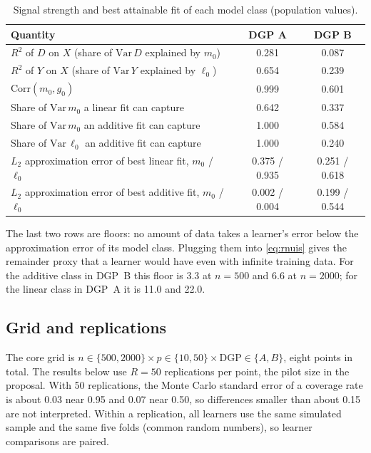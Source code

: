 \documentclass[11pt,a4paper]{article}
\begin{document}
\begin{table}[t]
\centering\small
\caption{Signal strength and best attainable fit of each model class (population values).}\label{tab:dgp}
\begin{tabular}{lcc}
\toprule
Quantity & DGP A & DGP B\\
\midrule
$R^2$ of $D$ on $X$ (share of $\mathrm{Var}\,D$ explained by $m_0$) & 0.281 & 0.087\\
$R^2$ of $Y$ on $X$ (share of $\mathrm{Var}\,Y$ explained by $\ell_0$) & 0.654 & 0.239\\
$\mathrm{Corr}(m_0,g_0)$ & 0.999 & 0.601\\
Share of $\mathrm{Var}\,m_0$ a linear fit can capture & 0.642 & 0.337\\
Share of $\mathrm{Var}\,m_0$ an additive fit can capture & 1.000 & 0.584\\
Share of $\mathrm{Var}\,\ell_0$ an additive fit can capture & 1.000 & 0.240\\
$L_2$ approximation error of best linear fit, $m_0$ / $\ell_0$ & 0.375 / 0.935 & 0.251 / 0.618\\
$L_2$ approximation error of best additive fit, $m_0$ / $\ell_0$ & 0.002 / 0.004 & 0.199 / 0.544\\
\bottomrule
\end{tabular}
\end{table}

The last two rows are floors: no amount of data takes a learner's error below the approximation error of its model class. Plugging them into \eqref{eq:rnuis} gives the remainder proxy that a learner would have even with infinite training data. For the additive class in DGP~B this floor is 3.3 at $n=500$ and 6.6 at $n=2000$; for the linear class in DGP~A it is 11.0 and 22.0.

\subsection{Grid and replications}

The core grid is $n\in\{500,2000\}\times p\in\{10,50\}\times\text{DGP}\in\{A,B\}$, eight points in total. The results below use $R=50$ replications per point, the pilot size in the proposal. With 50 replications, the Monte Carlo standard error of a coverage rate is about 0.03 near 0.95 and 0.07 near 0.50, so differences smaller than about 0.15 are not interpreted. Within a replication, all learners use the same simulated sample and the same five folds (common random numbers), so learner comparisons are paired.
\end{document}
